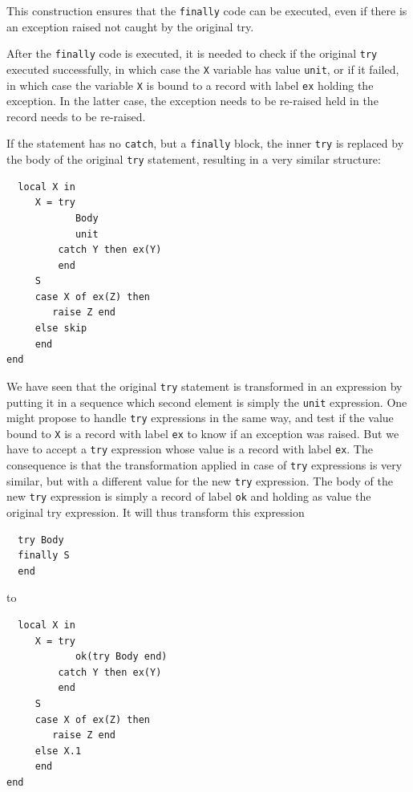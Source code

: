 \documentclass[a4paper]{memoir}
\begin{document}
This construction ensures that the \lstinline!finally! code can be executed,
even if there is an exception raised not caught by the original try.

After the \lstinline!finally! code is executed, it is needed to check if the
original \lstinline!try! executed successfully, in which case the \lstinline!X!
variable has value \lstinline!unit!, or if it failed, in which case the variable
\lstinline!X! is bound to a record with label \lstinline!ex! holding the
exception. In the latter case, the exception needs to be re-raised held in the
record needs to be re-raised.

If the statement has no \lstinline!catch!, but a \lstinline!finally! block, the
inner \lstinline!try! is replaced by the body of the original \lstinline!try!
statement, resulting in a very similar structure:
\begin{lstlisting}
  local X in 
     X = try 
            Body
            unit 
         catch Y then ex(Y)
         end 
     S 
     case X of ex(Z) then 
        raise Z end 
     else skip 
     end 
end  
\end{lstlisting}


We have seen that the original \lstinline!try! statement is transformed in an
expression by putting it in a sequence which second element is simply the
\lstinline!unit! expression. One might propose to handle \lstinline!try!
expressions in the same way, and test if the value bound to \lstinline!X! is a
record with label \lstinline!ex! to know if an exception was raised. 
But we have to accept a \lstinline!try! expression whose
value is a record with label \lstinline!ex!. The consequence is that the
transformation applied in case of \lstinline!try! expressions is very similar, 
but with a different value for the new \lstinline!try! expression.
The body of the new \lstinline!try! expression is simply a record of label
\lstinline!ok! and holding as value the original try expression.
It will thus transform this expression
\begin{lstlisting}
  try Body
  finally S 
  end
\end{lstlisting}

to

\begin{lstlisting}
  local X in 
     X = try 
            ok(try Body end)
         catch Y then ex(Y)
         end 
     S 
     case X of ex(Z) then 
        raise Z end 
     else X.1 
     end 
end  
\end{lstlisting}
\end{document}
